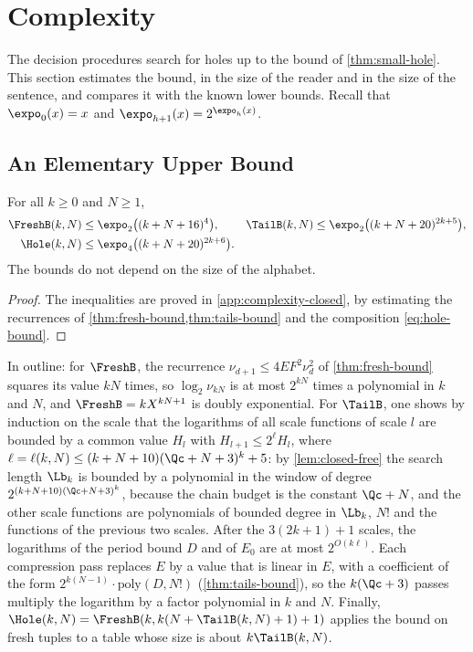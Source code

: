 \section{Complexity}
\label{sec:complexity}

The decision procedures search for holes up to the bound of
\cref{thm:small-hole}. This section estimates the bound, in the size of the
reader and in the size of the sentence, and compares it with the known lower
bounds. Recall that $\expo_0(x)=x$ and $\expo_{h+1}(x)=2^{\expo_h(x)}$.

\subsection{An Elementary Upper Bound}\label{sec:complexity-upper}

\begin{theorem}\label{thm:elementary}
For all $k\ge0$ and $N\ge1$,
\begin{align*}
  \FreshB(k,N)&\le\expo_2\bigl((k+N+16)^4\bigr), &
  \TailB(k,N)&\le\expo_2\bigl((k+N+20)^{2k+5}\bigr), \\
  \Hole(k,N)&\le\expo_4\bigl((k+N+20)^{2k+6}\bigr).
\end{align*}
The bounds do not depend on the size of the alphabet.
\end{theorem}

\begin{proof}
The inequalities are proved in \cref{app:complexity-closed}, by estimating
the recurrences of \cref{thm:fresh-bound,thm:tails-bound} and the
composition \eqref{eq:hole-bound}.
\end{proof}

In outline: for $\FreshB$, the recurrence $\nu_{d+1}\le 4E F^2\nu_d^2$ of
\cref{thm:fresh-bound} squares its value $kN$ times, so $\log_2\nu_{kN}$ is
at most $2^{kN}$ times a polynomial in $k$ and $N$, and $\FreshB=kX^{kN+1}$
is doubly exponential. For $\TailB$, one shows by induction on the scale
that the logarithms of all scale functions of scale $l$ are bounded by a
common value $H_l$ with $H_{l+1}\le2^{\ell}H_l$, where
$\ell=\ell(k,N)\le(k+N+10)(\Qc+N+3)^k+5$: by \cref{lem:closed-free} the search
length $\Lb_k$ is bounded by a polynomial in the window of degree
$2^{(k+N+10)(\Qc+N+3)^k}$, because the chain budget is the constant $\Qc+N$, and the
other scale functions are polynomials of bounded degree in $\Lb_k$, $N!$ and
the functions of the previous two scales. After the $3(2k+1)+1$ scales, the
logarithms of the period bound $D$ and of $E_0$ are at most
$2^{O(k\ell)}$. Each compression pass replaces $E$ by a value that is linear
in $E$, with a coefficient of the form $2^{k(N-1)}\cdot\mathrm{poly}(D,N!)$
(\cref{thm:tails-bound}), so the $k(\Qc+3)$ passes multiply the logarithm by a
factor polynomial in $k$ and $N$. Finally,
$\Hole(k,N)=\FreshB(k,k(N+\TailB(k,N)+1)+1)$ applies the bound on fresh
tuples to a table whose size is about $k\TailB(k,N)$.

